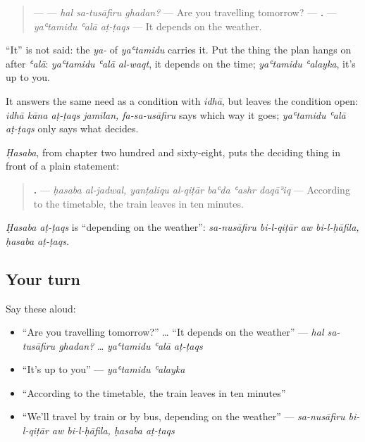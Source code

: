 \begin{grammarlens}[title={Grammar Lens: it depends on}]
\begin{quote}
— \textbf{  } — \emph{hal sa-tusāfiru ghadan?} — Are you travelling tomorrow? — \textbf{  .} — \emph{yaʿtamidu ʿalā aṭ-ṭaqs} — It depends on the weather.
\end{quote}

\textquotedblleft{}It\textquotedblright{} is not said: the \emph{ya-} of \emph{yaʿtamidu} carries it. Put the thing the plan hangs on after \emph{ʿalā}: \emph{yaʿtamidu ʿalā al-waqt}, it depends on the time; \emph{yaʿtamidu ʿalayka}, it's up to you.

It answers the same need as a condition with \emph{idhā}, but leaves the condition open: \emph{idhā kāna aṭ-ṭaqs jamīlan, fa-sa-usāfiru} says which way it goes; \emph{yaʿtamidu ʿalā aṭ-ṭaqs} only says what decides.
\end{grammarlens}

\begin{grammarlens}[title={Grammar Lens: ḥasaba, according to}]
\emph{Ḥasaba}, from chapter two hundred and sixty-eight, puts the deciding thing in front of a plain statement:

\begin{quote}
\textbf{      .} — \emph{ḥasaba al-jadwal, yanṭaliqu al-qiṭār baʿda ʿashr daqāʾiq} — According to the timetable, the train leaves in ten minutes.
\end{quote}

\emph{Ḥasaba aṭ-ṭaqs} is \textquotedblleft{}depending on the weather\textquotedblright{}: \emph{sa-nusāfiru bi-l-qiṭār aw bi-l-ḥāfila, ḥasaba aṭ-ṭaqs}.
\end{grammarlens}

\subsection*{Your turn}
Say these aloud:

\begin{itemize}
\raggedright
  \item \textquotedblleft{}Are you travelling tomorrow?\textquotedblright{} … \textquotedblleft{}It depends on the weather\textquotedblright{} — \emph{hal sa-tusāfiru ghadan?} … \emph{yaʿtamidu ʿalā aṭ-ṭaqs}
  \item \textquotedblleft{}It's up to you\textquotedblright{} — \emph{yaʿtamidu ʿalayka}
  \item \textquotedblleft{}According to the timetable, the train leaves in ten minutes\textquotedblright{}
  \item \textquotedblleft{}We'll travel by train or by bus, depending on the weather\textquotedblright{} — \emph{sa-nusāfiru bi-l-qiṭār aw bi-l-ḥāfila, ḥasaba aṭ-ṭaqs}
\end{itemize}

